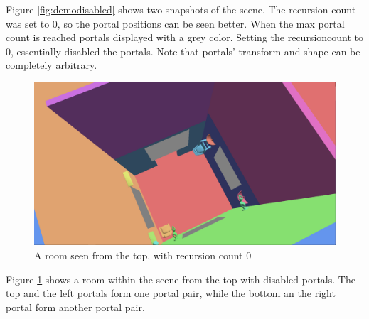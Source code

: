 Figure \ref{fig:demodisabled} shows two snapshots of the scene. The recursion count was set to 0,  so the portal positions can be seen better. When the max portal count is reached portals displayed with a grey color. Setting the \gls{recursioncount} to 0, essentially disabled the portals. Note that portals' transform and shape can be completely arbitrary.

\begin{figure}[H]
	\centering
	\includegraphics[width=\linewidth]{images/room.png}
	\caption{A room seen from the top, with recursion count 0}
	\label{fig:roomlayout}
\end{figure}

Figure \ref{fig:roomlayout} shows a room within the scene from the top with disabled portals. The top and the left portals form one portal pair, while the bottom an the right portal form another portal pair.


